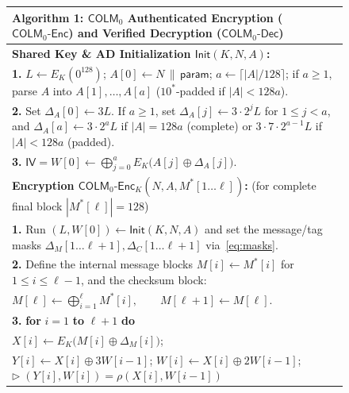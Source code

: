 \documentclass[11pt,a4paper]{article}
\theoremstyle{definition}
\theoremstyle{remark}
\newcommand{\COLMzero}{\mathsf{COLM}_0}
\newcommand{\IV}{\mathsf{IV}}
\begin{document}
\begin{figure}[t]
\centering
\small
\begin{tabular}{@{}p{}@{}}
\toprule
\textbf{Algorithm 1:} $\COLMzero$ Authenticated Encryption ($\mathsf{COLM}_0\text{-}\mathsf{Enc}$) and Verified Decryption ($\mathsf{COLM}_0\text{-}\mathsf{Dec}$) \\
\midrule
\textbf{Shared Key \& AD Initialization $\mathsf{Init}(K, N, A)$:} \\
\hspace*{1.2em} \textbf{1.} $L \leftarrow E_K(0^{128})$; \quad $A[0] \leftarrow N \,\|\, \mathsf{param}$; \quad $a \leftarrow \lceil |A|/128 \rceil$; \quad if $a \ge 1$, parse $A$ into $A[1], \dots, A[a]$ ($10^*$-padded if $|A| < 128a$). \\
\hspace*{1.2em} \textbf{2.} Set $\Delta_A[0] \leftarrow 3L$. If $a \ge 1$, set $\Delta_A[j] \leftarrow 3 \cdot 2^j L$ for $1 \le j < a$, and $\Delta_A[a] \leftarrow 3 \cdot 2^a L$ if $|A| = 128a$ (complete) or $3 \cdot 7 \cdot 2^{a-1} L$ if $|A| < 128a$ (padded). \\
\hspace*{1.2em} \textbf{3.} $\IV = W[0] \leftarrow \bigoplus_{j=0}^{a} E_K\big(A[j] \oplus \Delta_A[j]\big)$. \\[4pt]
\midrule
\textbf{Encryption $\mathsf{COLM}_0\text{-}\mathsf{Enc}_K(N, A, M^*[1 \dots \ell])$:} \hfill (for complete final block $|M^*[\ell]| = 128$) \\
\hspace*{1.2em} \textbf{1.} Run $(L, W[0]) \leftarrow \mathsf{Init}(K, N, A)$ and set the message/tag masks $\Delta_M[1 \dots \ell+1], \Delta_C[1 \dots \ell+1]$ via~\eqref{eq:masks}. \\
\hspace*{1.2em} \textbf{2.} Define the internal message blocks $M[i] \leftarrow M^*[i]$ for $1 \le i \le \ell - 1$, and the checksum block: \\
\hspace*{3.0em} $M[\ell] \leftarrow \bigoplus_{i=1}^{\ell} M^*[i], \qquad M[\ell + 1] \leftarrow M[\ell]$. \\
\hspace*{1.2em} \textbf{3.} \textbf{for} $i = 1$ \textbf{to} $\ell + 1$ \textbf{do} \\
\hspace*{3.0em} $X[i] \leftarrow E_K\big(M[i] \oplus \Delta_M[i]\big)$; \\
\hspace*{3.0em} $Y[i] \leftarrow X[i] \oplus 3W[i-1]$; \quad $W[i] \leftarrow X[i] \oplus 2W[i-1]$; \hfill $\triangleright\; (Y[i], W[i]) = \rho(X[i], W[i-1])$ \\

\end{tabular}
\end{figure}
\end{document}
